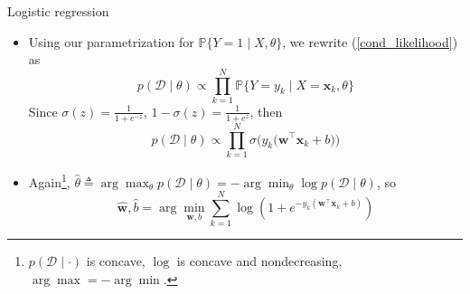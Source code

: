 \documentclass{beamer}
\numberwithin{equation}{section}
\newcommand{\aref}[1]{\alert{\ref{#1}}}
\begin{document}
\begin{frame}{Logistic regression}
    \begin{itemize}
        \item
        Using our parametrization for $ \mathbb{P}\{Y = 1 \mid X, \theta\} $,
        we rewrite (\aref{cond_likelihood}) as
        \begin{equation*}
            p(\mathcal{D} \mid \theta) \propto
            \prod_{k = 1}^N\mathbb{P}\{Y = y_k \mid X = \mathbf{x}_k, \theta\}
        \end{equation*}
        Since $ \sigma(z) = \frac{1}{1 + e^{-z}} $, 
        $ 1 - \sigma(z) = \frac{1}{1 + e^z} $, then
        \begin{equation*}
            p(\mathcal{D} \mid \theta) \propto \prod_{k = 1}^N
            \sigma\big(y_k\big(\mathbf{w}^\top\mathbf{x}_k + b\big)\big)
        \end{equation*}

        \item
        Again\footnote{
            $ p(\mathcal{D} \mid \cdot) $ is concave, $ \log $ is concave
            and nondecreasing, $ \arg\max = -\arg\min $.
        }, $ \hat{\theta} \triangleq \arg\max_\theta
        p(\mathcal{D} \mid \theta) = -\arg\min_\theta
        \log p(\mathcal{D} \mid \theta) $, so
        \begin{equation} \label{logreg_like2cost}
            \hat{\mathbf{w}}, \hat{b} = \arg\min_{\mathbf{w}, b}\sum_{k = 1}^N
            \log\left(1 + e^{-y_k(\mathbf{w}^\top\mathbf{x}_k + b)}\right)
        \end{equation}
    \end{itemize}

    \medskip
\end{frame}
\end{document}
